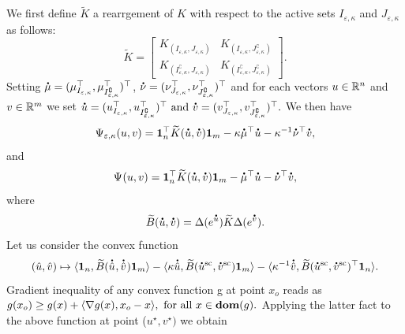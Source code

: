 We first define $\widetilde{K}$ a rearrgement of $K$ with respect to the active sets $I_{\varepsilon,\kappa}$ and $J_{\varepsilon,\kappa}$as follows:
\begin{equation*}
\widetilde{K} = 
\begin{bmatrix}
K_{(I_{\varepsilon,\kappa}, J_{\varepsilon,\kappa})} & K_{(I_{\varepsilon,\kappa}, J^\complement_{\varepsilon,\kappa})}\\
K_{(I^\complement_{\varepsilon,\kappa}, J_{\varepsilon,\kappa})} &K_{(I^\complement_{\varepsilon,\kappa}, J^\complement_{\varepsilon,\kappa})}
\end{bmatrix}.
\end{equation*}
Setting $\dt{\mu} = (\mu_{I_{\varepsilon,\kappa}}^\top, \mu_{I^\complement_{\varepsilon,\kappa}}^\top)^\top$, $\dt{\nu} = (\nu_{J_{\varepsilon,\kappa}}^\top, \nu_{J^\complement_{\varepsilon,\kappa}}^\top)^\top$ and for each vectors $u \in {\mathbb{R}}^n$ and $v\in {\mathbb{R}}^m$ we set $\dt{u} =(u_{I_{\varepsilon,\kappa}}^\top, u_{I^\complement_{\varepsilon,\kappa}}^\top)^\top  \text{ and } \dt{v} =(v_{J_{\varepsilon,\kappa}}^\top, v_{J^\complement_{\varepsilon,\kappa}}^\top)^\top.$
We then have 
\begin{equation*}
\Psi_{\varepsilon, \kappa} (u,v) = \mathbf 1_n^\top \widetilde{K}(\dt{u}, \dt{v}) \mathbf 1_m - \kappa \dt{\mu}^\top \dt{u} - \kappa^{-1} \dt{\nu}^\top \dt{v},
\end{equation*}
and 
\begin{equation*}
\Psi_{} (u,v) = \mathbf 1_n^\top \widetilde{K}(\dt{u}, \dt{v}) \mathbf 1_m - \dt{\mu}^\top \dt{u} - \dt{\nu}^\top \dt{v},
\end{equation*}
where
\begin{equation*}
  \widetilde{B}(\dt{u}, \dt{v}) = \Delta(e^{\dt{u}})\widetilde{K} \Delta(e^{\dt{v}}).
\end{equation*}
Let us consider the convex function
\begin{equation*}
	(\hat u, \hat v) \mapsto \inr{\mathbf 1_n, \widetilde{B}(\dt{\hat u}^{\text{}} ,\dt{\hat v}^{\text{}})\mathbf 1_m} - \inr{\kappa\dt{\hat u}, \widetilde{B}(\dt{u}^{\text{sc}} ,\dt{v}^{\text{sc}})\mathbf 1_m} - \inr{\kappa^{-1}\dt{\hat v}, \widetilde{B}(\dt{u}^{\text{sc}} ,\dt{v}^{\text{sc}})^\top\mathbf 1_n}.
\end{equation*}
Gradient inequality of any convex function g at point $x_o$ reads as $g(x_o) \geq g(x) + \langle \nabla g(x), x_o - x \rangle, \text{ for all } x \in \textbf{dom}(g).$
Applying the latter fact to the above function at point ($u^{\star}, v^{\star})$ we obtain
